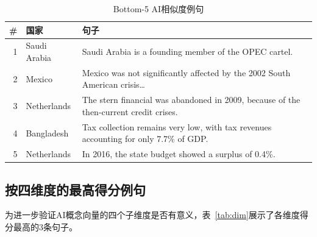 \documentclass[11pt,a4paper]{article}
\begin{document}
\begin{table}[H]\centering\footnotesize
\caption{Bottom-5 AI相似度例句}\label{tab:bottom5}
\begin{tabular}{rlp{11cm}}
\toprule\textbf{\#} & \textbf{国家} & \textbf{句子} \\
\midrule
1 & Saudi Arabia & Saudi Arabia is a founding member of the OPEC cartel. \\
2 & Mexico & Mexico was not significantly affected by the 2002 South American crisis\dots \\
3 & Netherlands & The stern financial was abandoned in 2009, because of the then-current credit crises. \\
4 & Bangladesh & Tax collection remains very low, with tax revenues accounting for only 7.7\% of GDP. \\
5 & Netherlands & In 2016, the state budget showed a surplus of 0.4\%. \\
\bottomrule
\end{tabular}
\end{table}

\subsection{按四维度的最高得分例句}
为进一步验证AI概念向量的四个子维度是否有意义，表~\ref{tab:dim}展示了各维度得分最高的3条句子。
\end{document}
